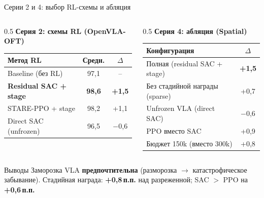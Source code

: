 \documentclass[aspectratio=169,13pt]{beamer}
\begin{document}
\begin{frame}{Серии 2 и 4: выбор RL-схемы и абляция}
  \begin{columns}[T]
    \begin{column}{0.5\textwidth}
      \footnotesize\centering
      \textbf{Серия 2: схемы RL (OpenVLA-OFT)}\\[2pt]
      \setlength{\tabcolsep}{3pt}
      \begin{tabular}{lcc}
        \toprule
        \textbf{Метод RL} & \textbf{Средн.} & \textbf{$\Delta$} \\
        \midrule
        Baseline (без RL)        & 97,1 & -- \\
        \textbf{Residual SAC + stage} & \textbf{98,6} & \textbf{+1,5} \\
        STARE-PPO + stage        & 98,2 & +1,1 \\
        Direct SAC (unfrozen)    & 96,5 & \textcolor{red!70!black}{$-$0,6} \\
        \bottomrule
      \end{tabular}
    \end{column}
    \begin{column}{0.5\textwidth}
      \footnotesize\centering
      \textbf{Серия 4: абляция (Spatial)}\\[2pt]
      \setlength{\tabcolsep}{3pt}
      \begin{tabular}{lc}
        \toprule
        \textbf{Конфигурация} & \textbf{$\Delta$} \\
        \midrule
        Полная (residual SAC + stage) & \textbf{+1,5} \\
        Без стадийной награды (sparse) & +0,7 \\
        Unfrozen VLA (direct SAC) & \textcolor{red!70!black}{$-$0,6} \\
        PPO вместо SAC & +0,9 \\
        Бюджет 150k (вместо 300k) & +0,8 \\
        \bottomrule
      \end{tabular}
    \end{column}
  \end{columns}
  \vspace{6pt}
  \begin{alertblock}{Выводы}
    \small Заморозка VLA \textbf{предпочтительна} (разморозка $\to$ катастрофическое забывание). Стадийная награда: \textbf{+0,8\,п.п.} над разреженной; SAC $>$ PPO на \textbf{+0,6\,п.п.}
  \end{alertblock}
\end{frame}
\end{document}
